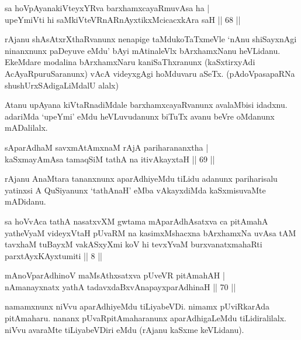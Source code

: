 \begin{shl}
sa hoVpAyanakiVteyxYRva barxhamxcayaRmuvAsa ha | \\
upeYmiVti hi saMkiVteVRnARnAyxtikxMcicacxkAra saH \hfill|| 68 ||  
\end{shl}

\begin{artha}
rAjanu shAsAtxrXthaRvanunx nenapige taMdukoTaTxmeVle `nAnu shiSayxnAgi ninanxnunx paDeyuve eMdu' bAyi mAtinaleVlx bArxhamxNanu heVLidanu. EkeMdare modalina bArxhamxNaru kaniSaThxranunx (kaSxtirxyAdi AcAyaRpuruSaranunx) vAcA videyxgAgi hoMduvaru aSeTx. (pAdoVpasapaRNa shushUrxSAdigaLiMdalU alalx)

Atanu upAyana kiVtaRnadiMdale barxhamxcayaRvanunx avalaMbisi idadxnu. adariMda `upeYmi' eMdu heVLuvudanunx biTuTx avanu beVre oMdanunx mADalilalx.
\end{artha}

\begin{shl}
sAparAdhaM savxmAtAmxnaM rAjA pariharananxtha | \\
kaSxmayAmAsa tamaqSiM tathA na itivAkayxtaH \hfill|| 69 || 
\end{shl}

\begin{artha}
rAjanu AnaMtara tananxnunx aparAdhiyeMdu tiLidu adanunx pariharisalu yatinxsi A QuSiyanunx `tathAnaH' eMba vAkayxdiMda kaSxmisuvaMte mADidanu.
\end{artha}



\begin{shl}
sa hoVvAca tathA nasatxvXM gwtama mAparAdhAsatxva ca pitAmahA yatheVyaM videyxVtaH pUvaRM na kasimxMshacxna bArxhamxNa uvAsa tAM tavxhaM tuBayxM vakASxyXmi koV hi tevxYvaM burxvanatxmahaRti parxtAyxKAyxtumiti || 8 ||
\end{shl}

\begin{shl}
mAnoV\s parAdhinoV maMsAthxsatxva pUveVR pitAmahAH | \\
nAmanayxnatx yathA tadavxdaBxvAnapayxparAdhinaH \hfill|| 70 || 
\end{shl}

\begin{artha}
namamxnunx niVvu aparAdhiyeMdu tiLiyabeVDi. nimamx pUviRkarAda 
pitAmaharu. nananx pUvaRpitAmaharanunx aparAdhigaLeMdu tiLidiralilalx. 
niVvu avaraMte tiLiyabeVDiri eMdu (rAjanu kaSxme keVLidanu).
\end{artha}


